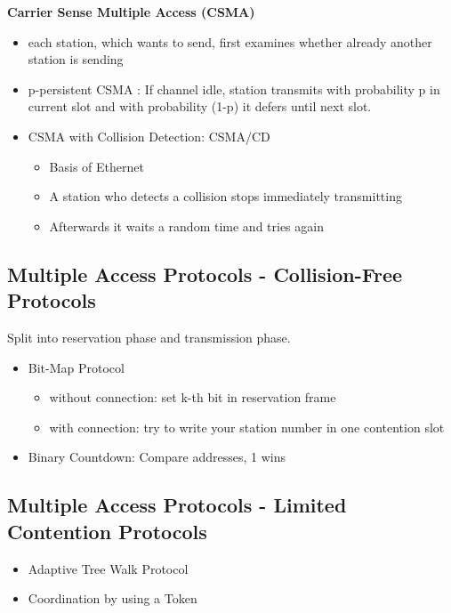 \documentclass[11pt,ngerman]{article}
\begin{document}
\noindent \textbf{Carrier	Sense	Multiple	Access	(CSMA)}
\begin{itemize}[noitemsep,nolistsep]
\item 	each	station,	which	wants	to	send,	first	examines	whether	already	
another	station	is	sending
\item p-persistent	CSMA :  If	channel	idle,	station	transmits	with	probability	p in	current	slot	and	with	probability		(1-p)	it	defers	until	next	slot.
\item CSMA	with	Collision	Detection:	CSMA/CD
	\begin{itemize}[noitemsep,nolistsep]
	\item Basis	of	Ethernet
	\item A	station	who	detects	a	collision	stops	immediately	transmitting
	\item Afterwards	it	waits	a	random	time	and	tries	again
	\end{itemize}
\end{itemize}

\subsection{Multiple	Access	Protocols - Collision-Free	Protocols}
Split into reservation phase and transmission phase.

\begin{itemize}[noitemsep,nolistsep]
\item Bit-Map	Protocol 
	\begin{itemize}[noitemsep,nolistsep]
	\item without connection: set k-th bit in reservation frame
	\item with connection: try to write your station number in one contention slot
	\end{itemize}
\item Binary	Countdown: Compare addresses, 1 wins
\end{itemize}

\subsection{Multiple	Access	Protocols - Limited	Contention	Protocols}
\begin{itemize}[noitemsep,nolistsep]
\item Adaptive	Tree	Walk	Protocol
\item Coordination	by	using	a	Token
\end{itemize}
\end{document}
